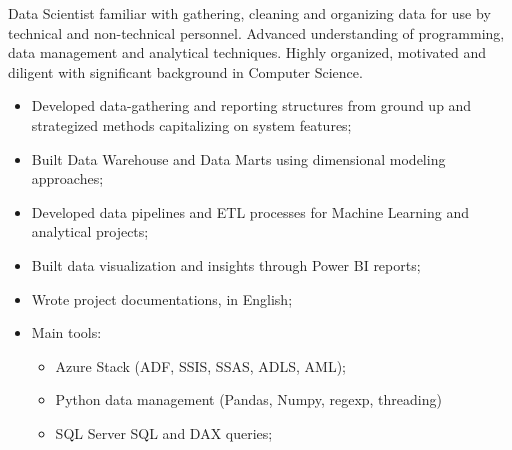 \documentclass[10pt,a4paper]{altacv}
\begin{document}
\tagline{}

%

\begin{fullwidth}
\makecvheader
\end{fullwidth}

%



\justifying
    Data Scientist familiar with gathering, cleaning and organizing data for use by technical and non-technical personnel. Advanced understanding of programming, data management and analytical techniques. Highly organized, motivated and diligent with significant background in Computer Science.






\begin{itemize}
	\item Developed data-gathering and reporting structures from ground up and strategized methods capitalizing on system features;
	\item Built Data Warehouse and Data Marts using dimensional modeling approaches;
	\item Developed data pipelines and ETL processes for Machine Learning and analytical projects;
	\item Built data visualization and insights through Power BI reports;
	\item Wrote project documentations, in English;
	\item Main tools:
	\begin{itemize}
	    \item Azure Stack (ADF, SSIS, SSAS, ADLS, AML);
	    \item Python data management (Pandas, Numpy, regexp, threading)
	    \item SQL Server SQL and DAX queries;
	\end{itemize}
\end{itemize}
\end{document}
